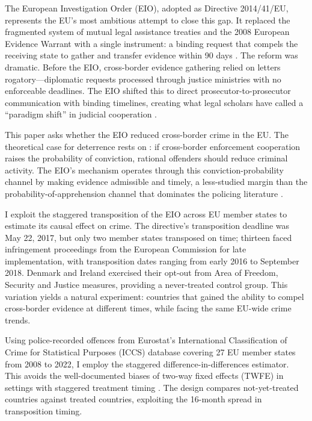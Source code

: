 \documentclass[12pt]{article}
\begin{document}
The European Investigation Order (EIO), adopted as Directive 2014/41/EU, represents the EU's most ambitious attempt to close this gap. It replaced the fragmented system of mutual legal assistance treaties and the 2008 European Evidence Warrant with a single instrument: a binding request that compels the receiving state to gather and transfer evidence within 90 days \citep{mangiaracina2014eio}. The reform was dramatic. Before the EIO, cross-border evidence gathering relied on letters rogatory---diplomatic requests processed through justice ministries with no enforceable deadlines. The EIO shifted this to direct prosecutor-to-prosecutor communication with binding timelines, creating what legal scholars have called a ``paradigm shift'' in judicial cooperation \citep{allegrezza2019eio}.

This paper asks whether the EIO reduced cross-border crime in the EU. The theoretical case for deterrence rests on \citet{becker1968crime}: if cross-border enforcement cooperation raises the probability of conviction, rational offenders should reduce criminal activity. The EIO's mechanism operates through this conviction-probability channel by making evidence admissible and timely, a less-studied margin than the probability-of-apprehension channel that dominates the policing literature \citep{chalfin2022criminal, draca2011panic}.

I exploit the staggered transposition of the EIO across EU member states to estimate its causal effect on crime. The directive's transposition deadline was May 22, 2017, but only two member states transposed on time; thirteen faced infringement proceedings from the European Commission for late implementation, with transposition dates ranging from early 2016 to September 2018. Denmark and Ireland exercised their opt-out from Area of Freedom, Security and Justice measures, providing a never-treated control group. This variation yields a natural experiment: countries that gained the ability to compel cross-border evidence at different times, while facing the same EU-wide crime trends.

Using police-recorded offences from Eurostat's International Classification of Crime for Statistical Purposes (ICCS) database covering 27 EU member states from 2008 to 2022, I employ the \citet{callaway2021did} staggered difference-in-differences estimator. This avoids the well-documented biases of two-way fixed effects (TWFE) in settings with staggered treatment timing \citep{goodman2021did, sun2021estimating}. The design compares not-yet-treated countries against treated countries, exploiting the 16-month spread in transposition timing.
\end{document}
